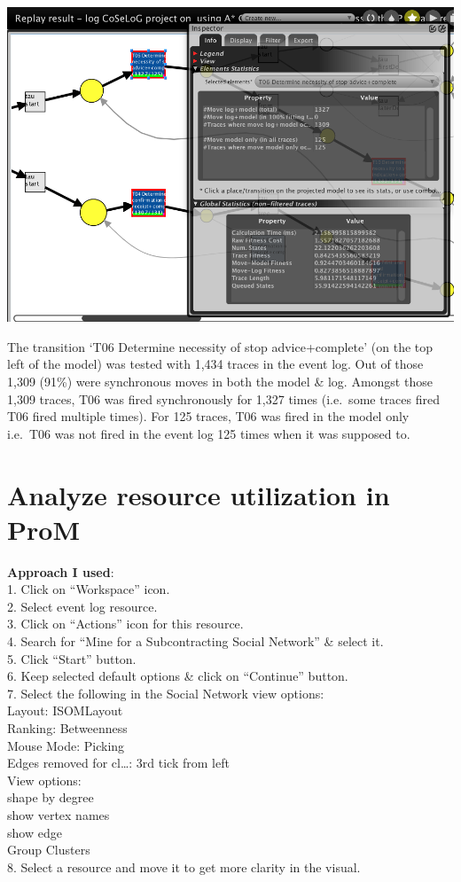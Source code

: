 \documentclass[]{article}
\begin{document}
\includegraphics{CoSeLoG_Step_06_PetriNet_Normative_Conformance_T06.png}

The transition `T06 Determine necessity of stop advice+complete' (on the
top left of the model) was tested with 1,434 traces in the event log.
Out of those 1,309 (91\%) were synchronous moves in both the model \&
log. Amongst those 1,309 traces, T06 was fired synchronously for 1,327
times (i.e.~some traces fired T06 fired multiple times). For 125 traces,
T06 was fired in the model only i.e.~T06 was not fired in the event log
125 times when it was supposed to.

\section{Analyze resource utilization in
ProM}\label{analyze-resource-utilization-in-prom}

\textbf{Approach I used}:\\1. Click on ``Workspace'' icon.\\2. Select
event log resource.\\3. Click on ``Actions'' icon for this resource.\\4.
Search for ``Mine for a Subcontracting Social Network'' \& select
it.\\5. Click ``Start'' button.\\6. Keep selected default options \&
click on ``Continue'' button.\\7. Select the following in the Social
Network view options:\\ Layout: ISOMLayout\\ Ranking: Betweenness\\
Mouse Mode: Picking\\ Edges removed for cl\ldots{}: 3rd tick from left\\
View options:\\ shape by degree\\ show vertex names\\ show edge\\ Group
Clusters\\8. Select a resource and move it to get more clarity in the
visual.
\end{document}
